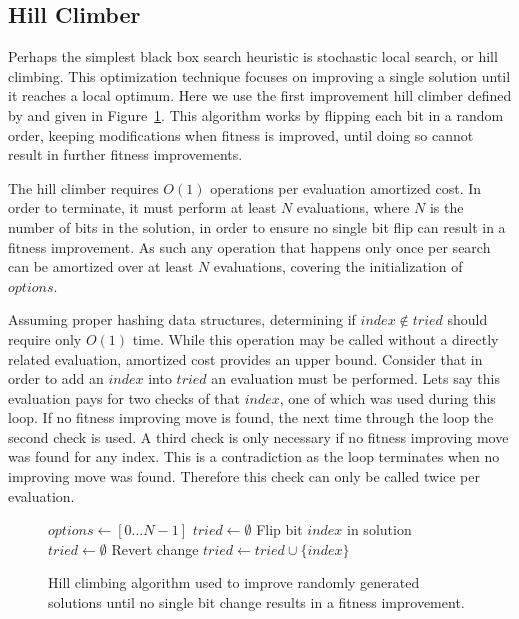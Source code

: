 \documentclass[twoside]{article}
\begin{document}
\subsection{Hill Climber}
Perhaps the simplest black box search heuristic is stochastic local search, or hill climbing.
This optimization technique focuses on improving a single solution until it reaches a local
optimum. Here we use the first improvement hill climber defined by \cite{goldman:2014:p3}
and given in Figure~\ref{fig-hc}. This algorithm works by flipping each bit in a random
order, keeping modifications when fitness is improved, until doing so cannot result in
further fitness improvements.

The hill climber requires $O(1)$ operations per evaluation amortized cost. In order to
terminate, it must perform at least $N$ evaluations, where $N$ is the number of bits
in the solution, in order to ensure no single bit flip can result in a fitness improvement.
As such any operation that happens only once per search can be amortized over at least $N$
evaluations, covering the initialization of $options$.

Assuming proper hashing data structures, determining if $index \notin tried$ should require only $O(1)$
time. While this operation may be called without a directly related evaluation, amortized cost
provides an upper bound. Consider that in order to add an $index$ into $tried$ an evaluation must
be performed. Lets say this evaluation pays for two checks of that $index$, one of which was used
during this loop. If no fitness improving move is found, the next time through the loop the second check
is used. A third check is only necessary if no fitness improving move was found for any index.
This is a contradiction as the loop terminates when no improving move was found. Therefore this check
can only be called twice per evaluation.



\begin{figure}
  \begin{algorithmic}[1]
    \State $options \leftarrow [0 \dots N-1]$
    \State $tried \leftarrow \emptyset$
          \State Flip bit $index$ in solution
            \State $tried \leftarrow \emptyset$
          \Else
            \State Revert change
          \EndIf
          \State $tried \leftarrow tried \cup \{index\}$
        \EndIf
      \EndFor
    \EndWhile
  \EndProcedure
\end{algorithmic}
  \caption{Hill climbing algorithm used to improve randomly generated solutions until no single
           bit change results in a fitness improvement.}
  \label{fig-hc}
\end{figure}
\end{document}
